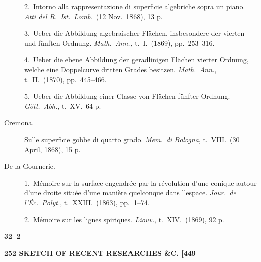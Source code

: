 \documentclass[11pt]{article}
\begin{document}
\begin{description}
\item[] 2.\ Intorno alla rappresentazione di superficie algebriche sopra un piano. \textit{Atti del R.\ Ist.\ Lomb.}\ (12 Nov.\ 1868), 13 p.

\item[] 3.\ Ueber die Abbildung algebraischer Fl\"achen, insbesondere der vierten und f\"unften Ordnung. \textit{Math.\ Ann.}, t.\ I.\ (1869), pp.~253--316.

\item[] 4.\ Ueber die ebene Abbildung der geradlinigen Fl\"achen vierter Ordnung, welche eine Doppelcurve dritten Grades besitzen. \textit{Math.\ Ann.}, t.\ II.\ (1870), pp.~445--466.

\item[] 5.\ Ueber die Abbildung einer Classe von Fl\"achen f\"unfter Ordnung. \textit{G\"ott.\ Abh.}, t.\ XV.\ 64 p.

\item[Cremona.] Sulle superficie gobbe di quarto grado. \textit{Mem.\ di Bologna}, t.\ VIII.\ (30 April, 1868), 15 p.

\item[De la Gournerie.] 1.\ M\'emoire sur la surface engendr\'ee par la r\'evolution d'une conique autour d'une droite situ\'ee d'une mani\`ere quelconque dans l'espace. \textit{Jour.\ de l'\'Ec.\ Polyt.}, t.\ XXIII.\ (1863), pp.~1--74.

\item[] 2.\ M\'emoire sur les lignes spiriques. \textit{Liouv.}, t.\ XIV.\ (1869), 92 p.
\end{description}

\medskip
\noindent\textbf{\hfill 32--2}

\medskip
\noindent\textbf{252 \hfill SKETCH OF RECENT RESEARCHES \&C. \hfill [449}

\medskip
\end{document}
